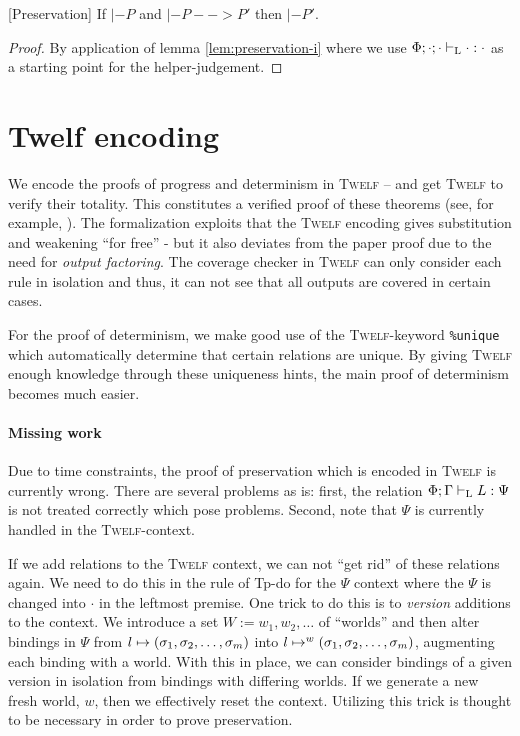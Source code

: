 \documentclass[a4paper, oneside, 10pt, draft]{memoir}
\newcommand{\twelf}{\textsc{Twelf}}
\begin{document}
\begin{thm}{[Preservation]}
  \label{thm:preservation}
  If $|- P$ and $|- P --> P'$ then $|- P'$.
\end{thm}
\begin{proof}
  By application of lemma \ref{lem:preservation-i} where we use
  $\Phi;\cdot;\cdot |-_{\mathrm{L}} \cdot : \cdot$ as a starting point for the
  helper-judgement.
\end{proof}

\section{Twelf encoding}

We encode the proofs of progress and determinism in \twelf{} -- and
get \twelf{} to verify their totality. This constitutes a verified
proof of these theorems (see, for example,
\cite{harper.crary:2005:how}). The formalization exploits that the
\twelf{} encoding gives substitution and weakening ``for free'' - but
it also deviates from the paper proof due to the need for \emph{output
  factoring}. The coverage checker in \twelf{} can only consider each
rule in isolation and thus, it can not see that all outputs are
covered in certain cases.

For the proof of determinism, we make good use of the \twelf{}-keyword
\texttt{\%{}unique} which automatically determine that certain
relations are unique. By giving \twelf{} enough knowledge through
these uniqueness hints, the main proof of determinism becomes much
easier.

\paragraph{Missing work}
Due to time constraints, the proof of preservation which is encoded in
\twelf{} is currently wrong. There are several problems as is: first,
the relation $\Phi;\Gamma |-_{\mathrm{L}} L : \Psi$ is not treated correctly
which pose problems. Second, note that $\Psi$ is currently handled in
the \twelf{}-context.

If we add relations to the \twelf{} context, we can not ``get rid'' of
these relations again. We need to do this in the rule of Tp-do for the
$\Psi$ context where the $\Psi$ is changed into $\cdot$ in the
leftmost premise. One trick to do this is to \emph{version} additions
to the context. We introduce a set $W := w_1, w_2, \dotsc$ of
``worlds'' and then alter bindings in $\Psi$ from $l \mapsto
(\sigma_1, \sigma_2, \dotsc, \sigma_m)$ into $l \mapsto^{w} (\sigma_1, \sigma_2, \dotsc, \sigma_m)$, augmenting each binding with
a world. With this in place, we can consider bindings of a
given version in isolation from bindings with differing worlds. If
we generate a new fresh world, $w$, then we effectively reset the
context. Utilizing this trick is thought to be necessary in order to
prove preservation.
\end{document}
